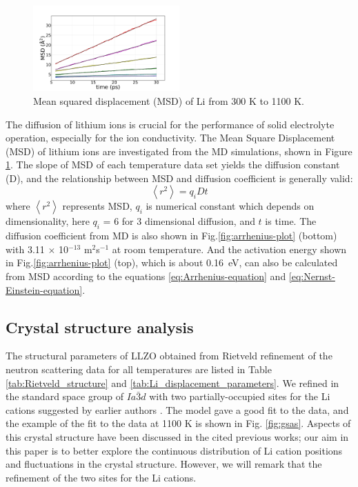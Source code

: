\documentclass[twoside,twocolumn,9pt]{article}
\begin{document}
\begin{figure}[t]
\centering
\includegraphics[width=0.5\textwidth]{Pics/MSD.pdf}
\caption{Mean squared displacement (MSD) of Li from 300 K to 1100 K.}
\label{fig:msd}
\end{figure}

The diffusion of lithium ions is crucial for the performance of solid electrolyte operation, especially for the ion conductivity.
The Mean Square Displacement (MSD) of lithium ions are investigated from the MD simulations, shown in Figure \ref{fig:msd}.
The slope of MSD of each temperature data set yields the diffusion constant (D), and the relationship between MSD and diffusion coefficient is generally valid:
\begin{equation}
\left< r^2 \right>=q_iDt
\end{equation}
where $\left< r^2 \right>$ represents MSD, $q_i$ is numerical constant which depends on dimensionality, here $q_i$ = 6 for 3 dimensional diffusion,
and $t$ is time. The diffusion coefficient from MD is also shown in Fig.\ref{fig:arrhenius-plot} (bottom) with 3.11 $\times$ 10$^{-13}$ m$^2$s$^{-1}$ at room temperature.
And the activation energy shown in Fig.\ref{fig:arrhenius-plot} (top), which is about 0.16~eV, can also be calculated from MSD according to the equations \ref{eq:Arrhenius-equation} and \ref{eq:Nernst-Einstein-equation}.


\subsection{Crystal structure analysis}

The structural parameters of LLZO obtained from Rietveld refinement of the neutron scattering data for all temperatures are listed in Table \ref{tab:Rietveld_structure} and \ref{tab:Li_displacement_parameters}. We refined in the standard space group of $Ia\bar{3}d$ with two partially-occupied sites for the Li cations suggested by earlier authors  \cite{Awaka:2009jv,Buschmann:2011jo,Geiger:2011cg, Awaka:2011il, DanielRettenwander:2016ei,Wagner:2016bh,Kataoka:2019go, Xie:2011gv,Han:2012is,Li:2012fz,Wang:2014ic}. The model gave a good fit to the data, and the example of the fit to the data at 1100 K is shown in Fig. \ref{fig:gsas}.  Aspects of this crystal structure have been discussed in the cited previous works; our aim in this paper is to better explore the continuous distribution of Li cation positions and fluctuations in the crystal structure. However, we will remark that the refinement of the two sites for the Li cations.
\end{document}
